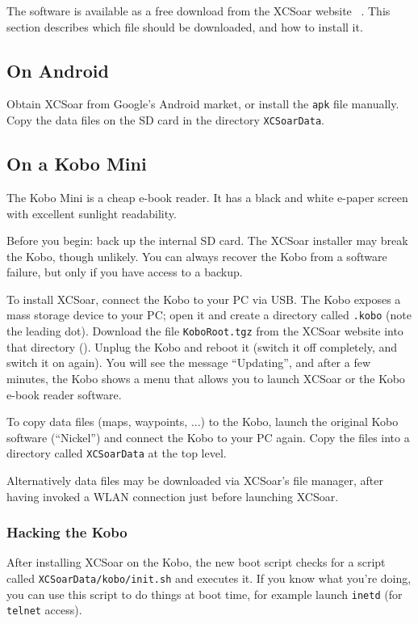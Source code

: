 The software is available as a free download from the XCSoar website
~\xcsoarwebsite{}.  This section describes which file should be
downloaded, and how to install it.

\subsection*{On Android}

Obtain XCSoar from Google's Android market, or install the \verb|apk|
file manually.  Copy the data files on the SD card in the directory
\verb|XCSoarData|.

\subsection*{On a Kobo Mini}

The Kobo Mini is a cheap e-book reader.  It has a black and white
e-paper screen with excellent sunlight readability.

Before you begin: back up the internal SD card.  The XCSoar installer
may break the Kobo, though unlikely.  You can always recover the Kobo
from a software failure, but only if you have access to a backup.

To install XCSoar, connect the Kobo to your PC via USB.  The Kobo
exposes a mass storage device to your PC; open it and create a
directory called \texttt{.kobo} (note the leading dot).  Download the
file \texttt{KoboRoot.tgz} from the XCSoar website into that
directory (). Unplug the Kobo and reboot it (switch it off completely,
and switch it on again).  You will see the message ``Updating'', and
after a few minutes, the Kobo shows a menu that allows you to launch
XCSoar or the Kobo \mbox{e-book} reader software.

To copy data files (maps, waypoints, ...) to the Kobo, launch the
original Kobo software (``Nickel'') and connect the Kobo to your PC
again.  Copy the files into a directory called \texttt{XCSoarData} at
the top level.

Alternatively data files may be downloaded via XCSoar's file manager,
after having invoked a WLAN connection just before launching XCSoar.

\subsubsection{Hacking the Kobo}

After installing XCSoar on the Kobo, the new boot script checks for a
script called \texttt{XCSoarData/kobo/init.sh} and executes it.  If
you know what you're doing, you can use this script to do things at
boot time, for example launch \texttt{inetd} (for \texttt{telnet}
access).

